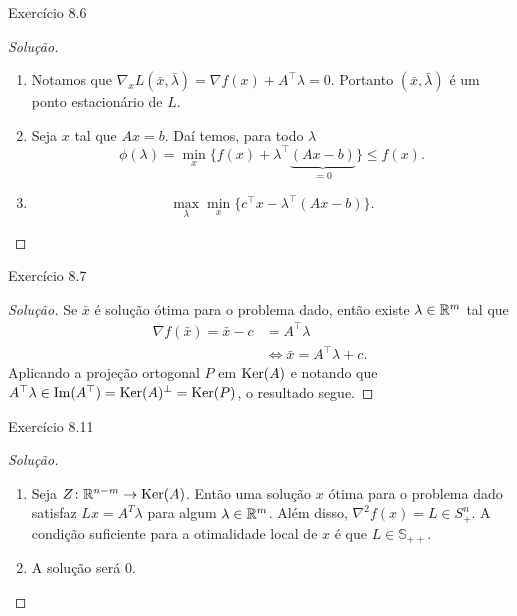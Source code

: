 \documentclass[12pt,twoside,a4paper]{article}
\begin{document}
\begin{problema}
  Exercício 8.6
\end{problema}
\begin{proof}[Solução]
  \begin{enumerate}
    \item Notamos que \(\nabla_xL(\bar{x},\bar{\lambda})=\nabla f(x)+
      A^\top\lambda = 0.\) Portanto \((\bar{x},\bar{\lambda})\) é um ponto
      estacionário de \(L\).
    \item Seja \(x\) tal que \(Ax=b\). Daí temos, para todo \(\lambda\)
      \[\phi(\lambda)=\min_x\{f(x)+\lambda^\top\underbrace{(Ax-b)}_{=0}\}\leq f(x).\]
      \item \[\max_\lambda{\min_x \{c^\top x -\lambda^\top(Ax-b)\}}.\]
   \end{enumerate}
 \end{proof}
 \begin{problema}
   Exercício 8.7
 \end{problema}
 \begin{proof}[Solução]
   Se \(\bar{x}\) é solução ótima para o problema dado, então existe
   \(\lambda\in\mathbb{R}^m\) tal que \begin{align*}\nabla f(\bar{x})=\bar{x}-c &=
                                                                              A^\top\lambda\\&\iff
                                    \bar{x}=A^\top\lambda+ c.\end{align*}
 Aplicando a projeção ortogonal \(P\) em \(\operatorname{Ker}(A)\) e notando que
 \(A^\top\lambda\in\text{Im}(A^\top)=\operatorname{Ker}(A)^\bot=\operatorname{Ker}(P)\), o resultado segue.
\end{proof}
\begin{problema}
Exercício 8.11  
\end{problema}
\begin{proof}[Solução]
  \begin{enumerate}
    \item Seja \(Z\colon\mathbb{R}^{n-m}\to\operatorname{Ker}(A)\). Então uma solução \(x\) ótima para o problema
dado satisfaz \(Lx=A^T\lambda\) para algum \(\lambda\in\mathbb{R}^m\). Além disso,
\(\nabla^2 f(x)= L \in S^n_+\). A condição suficiente para a otimalidade local
de \(x\) é que \(L\in\mathbb{S}_{++}\).

\item A solução será 0.
\end{enumerate}
\end{proof}
\end{document}
